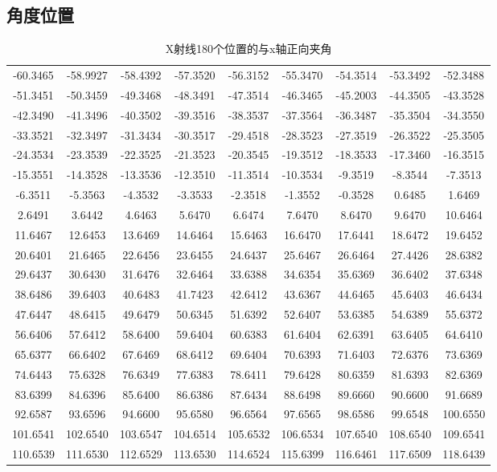 \documentclass{myart}
\begin{document}
\subsection{角度位置}
\begin{table}[H]
\centering
\caption{X射线180个位置的与x轴正向夹角}
\label{allangle}
\begin{tabular}{ccccccccc}
\toprule 
-60.3465 & -58.9927 & -58.4392 & -57.3520 & -56.3152 & -55.3470 & -54.3514 & -53.3492 & -52.3488\\
-51.3451 & -50.3459 & -49.3468 & -48.3491 & -47.3514 & -46.3465 & -45.2003 & -44.3505 & -43.3528 \\
-42.3490 & -41.3496 & -40.3502 & -39.3516 & -38.3537 & -37.3564 & -36.3487 & -35.3504 & -34.3550 \\
-33.3521 & -32.3497 & -31.3434 & -30.3517 & -29.4518 & -28.3523 & -27.3519 & -26.3522 & -25.3505 \\
-24.3534 & -23.3539 & -22.3525 & -21.3523 & -20.3545 & -19.3512 & -18.3533 & -17.3460 & -16.3515 \\
-15.3551 & -14.3528 & -13.3536 & -12.3510 & -11.3514 & -10.3534 & -9.3519 & -8.3544 & -7.3513 \\
-6.3511 & -5.3563 & -4.3532 & -3.3533 & -2.3518 & -1.3552 & -0.3528 & 0.6485 & 1.6469 \\
2.6491 & 3.6442 & 4.6463 & 5.6470 & 6.6474 & 7.6470 & 8.6470 & 9.6470 & 10.6464 \\
11.6467 & 12.6453 & 13.6469 & 14.6464 & 15.6463 & 16.6470 & 17.6441 & 18.6472 & 19.6452 \\
20.6401 & 21.6465 & 22.6456 & 23.6455 & 24.6437 & 25.6467 & 26.6464 & 27.4426 & 28.6382 \\
29.6437 & 30.6430 & 31.6476 & 32.6464 & 33.6388 & 34.6354 & 35.6369 & 36.6402 & 37.6348 \\
38.6486 & 39.6403 & 40.6483 & 41.7423 & 42.6412 & 43.6367 & 44.6465 & 45.6403 & 46.6434 \\
47.6447 & 48.6415 & 49.6479 & 50.6345 & 51.6392 & 52.6407 & 53.6385 & 54.6389 & 55.6372 \\
56.6406 & 57.6412 & 58.6400 & 59.6404 & 60.6383 & 61.6404 & 62.6391 & 63.6405 & 64.6410 \\
65.6377 & 66.6402 & 67.6469 & 68.6412 & 69.6404 & 70.6393 & 71.6403 & 72.6376 & 73.6369 \\
74.6443 & 75.6328 & 76.6349 & 77.6383 & 78.6411 & 79.6428 & 80.6359 & 81.6393 & 82.6369 \\
83.6399 & 84.6396 & 85.6400 & 86.6386 & 87.6434 & 88.6498 & 89.6660 & 90.6600 & 91.6689 \\
92.6587 & 93.6596 & 94.6600 & 95.6580 & 96.6564 & 97.6565 & 98.6586 & 99.6548 & 100.6550 \\
101.6541 & 102.6540 & 103.6547 & 104.6514 & 105.6532 & 106.6534 & 107.6540 & 108.6540 & 109.6541 \\
110.6539 & 111.6530 & 112.6529 & 113.6530 & 114.6524 & 115.6399 & 116.6461 & 117.6509 & 118.6439\\
\bottomrule
\end{tabular}
\end{table}
\end{document}

